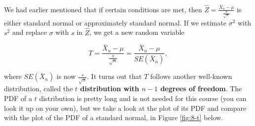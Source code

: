 \documentclass[
]{book}
\begin{document}
We had earlier mentioned that if certain conditions are met, then \(\hat{Z} = \frac{\bar{X}_n - \mu}{\frac{\sigma}{\sqrt{n}}}\) is either standard normal or approximately standard normal. If we estimate \(\sigma^2\) with \(s^2\) and replace \(\sigma\) with \(s\) in \(\hat{Z}\), we get a new random variable

\begin{equation} 
T =  \frac{\bar{X}_n - \mu}{\frac{s}{\sqrt{n}}} = \frac{\bar{X}_n - \mu}{SE(\bar{X}_n)},
\label{eq:8-tstat}
\end{equation}

where \(SE(\bar{X}_n)\) is now \(\frac{s}{\sqrt{n}}\). It turns out that \(T\) follows another well-known distribution, called the \textbf{\(t\) distribution with \(n-1\) degrees of freedom}. The PDF of a \(t\) distribution is pretty long and is not needed for this course (you can look it up on your own), but we take a look at the plot of its PDF and compare with the plot of the PDF of a standard normal, in Figure \ref{fig:8-t} below.
\end{document}
